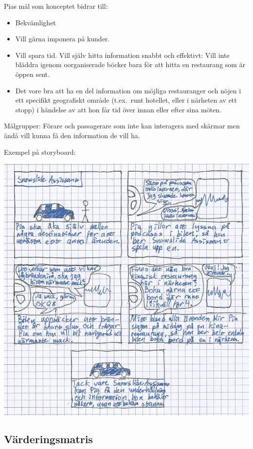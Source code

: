 \documentclass[a4paper,12pt,titlepage]{article}
\begin{document}
Pias mål som konceptet bidrar till:
\begin{itemize}
    \item Bekvämlighet
    \item Vill gärna imponera på kunder.
    \item Vill spara tid. Vill själv hitta
        information snabbt och effektivt: Vill
        inte bläddra igenom oorganiserade
        böcker bara för att hitta en restaurang
        som är öppen sent.
    \item Det vore bra att ha en del
        information om möjliga restauranger
        och nöjen i ett specifikt geografiskt
        område (t.ex.\ runt hotellet, eller i
        närheten av ett stopp) i händelse av
        att hon får tid över innan eller efter
        sina möten. 
\end{itemize}

Målgrupper: Förare och passagerare som inte kan interagera med skärmar men ändå
vill kunna få den information de vill ha.

\newpage
Exempel på storyboard:

\begin{center}
\includegraphics[width=15cm]{images/assistant.jpg}
\end{center}

\newpage
\subsection*{Värderingsmatris}
\end{document}
